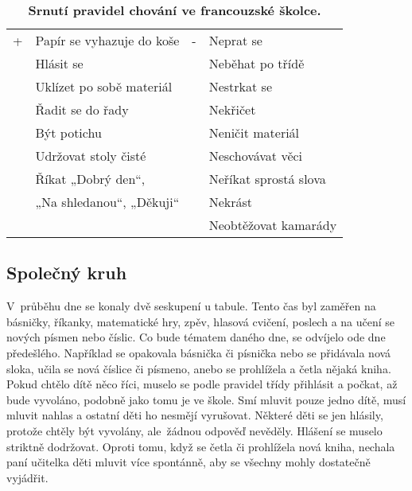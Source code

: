			\begin{spacing}{1.0}
			\begin{table}[h!]
				\center
				\begin{tabular}{|ll|ll|}
					\hline
					\rowcolor{grey!0}
				+	& Papír se vyhazuje do koše						& -	& Neprat se 			\\
					& Hlásit se 									&  	& Neběhat po třídě		\\
					& Uklízet po sobě materiál 						&	& Nestrkat se 			\\
					& Řadit se do řady 								&	& Nekřičet 				\\
					& Být potichu 									& 	& Neničit materiál 		\\
					& Udržovat stoly čisté 							& 	& Neschovávat věci 		\\
					& Říkat „Dobrý den“,							&	& Neříkat sprostá slova \\
					&  „Na shledanou“, „Děkuji“						&	& Nekrást				\\
					&												&	& Neobtěžovat kamarády 	\\
					\hline
				\end{tabular}
				\caption{ \textbf{Srnutí pravidel chování ve francouzské školce.}}
			\label{tab:pravidlaFR}
			\end{table}
			\end{spacing}

			\subsection{Společný kruh}
			V průběhu dne se konaly dvě seskupení u tabule. Tento čas byl zaměřen na básničky, říkanky, matematické hry, zpěv, hlasová cvičení, poslech a na učení se nových písmen nebo číslic. Co bude tématem daného dne, se odvíjelo ode dne předešlého. Například se opakovala básnička či písnička nebo se přidávala nová sloka, učila se nová číslice či písmeno, anebo se prohlížela a četla nějaká kniha. Pokud chtělo dítě něco říci, muselo se podle pravidel třídy přihlásit a počkat, až bude vyvoláno, podobně jako tomu je ve škole. Smí mluvit pouze jedno dítě, musí mluvit nahlas a ostatní děti ho nesmějí vyrušovat. Některé děti se jen hlásily, protože chtěly být vyvolány, ale žádnou odpověď nevěděly. Hlášení se muselo striktně dodržovat. Oproti tomu, když se četla či prohlížela nová kniha, nechala paní učitelka děti mluvit více spontánně, aby se všechny mohly dostatečně vyjádřit.

